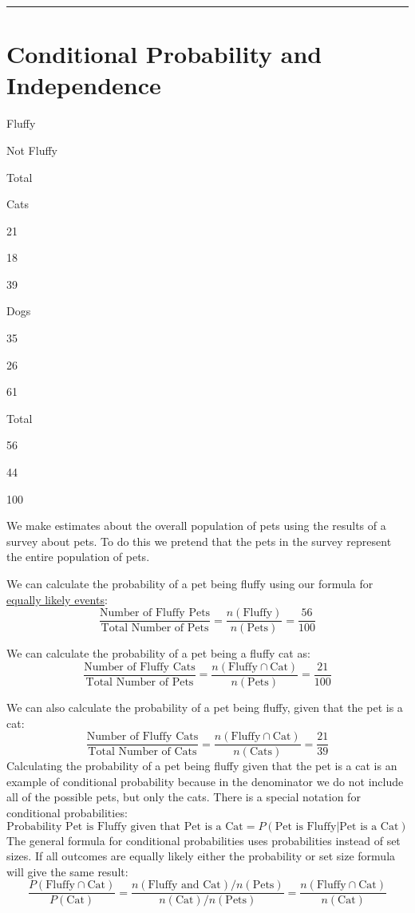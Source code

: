 \documentclass[
]{book}
\theoremstyle{definition}
\theoremstyle{definition}
\theoremstyle{definition}
\theoremstyle{remark}
\begin{document}
\begin{center}\rule{0.5\linewidth}{0.5pt}\end{center}

\hypertarget{conditional-probability-and-independence}{%
\section{Conditional Probability and Independence}\label{conditional-probability-and-independence}}

Fluffy

Not Fluffy

Total

Cats

21

18

39

Dogs

35

26

61

Total

56

44

100

We make estimates about the overall population of pets using the results of a survey about pets. To do this we pretend that the pets in the survey represent the entire population of pets.

We can calculate the probability of a pet being fluffy using our formula for \protect\hyperlink{equiprob}{equally likely events}:
\[\frac{\text{Number of Fluffy Pets}}{\text{Total Number of Pets}} = \frac{n(\text{Fluffy})}{n(\text{Pets})} = \frac{56}{100}\]

We can calculate the probability of a pet being a fluffy cat as:
\[\frac{\text{Number of Fluffy Cats}}{\text{Total Number of Pets}} = \frac{n(\text{Fluffy} \cap \text{Cat})}{n(\text{Pets})} = \frac{21}{100}\]

We can also calculate the probability of a pet being fluffy, given that the pet is a cat:
\[\frac{\text{Number of Fluffy Cats}}{\text{Total Number of Cats}} = \frac{n(\text{Fluffy} \cap \text{Cat})}{n(\text{Cats})}=\frac{21}{39}\]
Calculating the probability of a pet being fluffy given that the pet is a cat is an example of conditional probability because in the denominator we do not include all of the possible pets, but only the cats. There is a special notation for conditional probabilities:
\[\text{Probability Pet is Fluffy given that Pet is a Cat} = P(\text{Pet is Fluffy}|\text{Pet is a Cat})\]
The general formula for conditional probabilities uses probabilities instead of set sizes. If all outcomes are equally likely either the probability or set size formula will give the same result:
\[\frac{P(\text{Fluffy} \cap \text{Cat})}{P(\text{Cat})} =  
\frac{n(\text{Fluffy and Cat})/n(\text{Pets})}{n(\text{Cat})/n(\text{Pets})} = \frac{n(\text{Fluffy}\cap\text{Cat})}{n(\text{Cat})}\]
\end{document}
